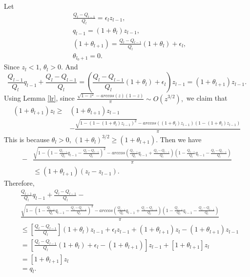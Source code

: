 \documentclass{article}
\begin{document}
Let
\begin{equation}
\begin{aligned}
&\frac{Q_{l}-Q_{l-1}}{Q_{l}}=\epsilon_lz_{l-1},\\
&q_{l-1}=(1+\theta_l)z_{l-1},\\
&(1+\theta_{l+1})=\frac{Q_l-Q_{l-1}}{Q_l}(1+\theta_l)+\epsilon_l,\\
&\theta_{l_0+1}=0.
\end{aligned}
\end{equation}
Since $z_l<1$, $\theta_{l}>0$. And
$$\frac{Q_{l-1}}{Q_{l}}q_{l-1}+\frac{Q_{l}-Q_{l-1}}{Q_{l}}=(\frac{Q_l-Q_{l-1}}{Q_l}(1+\theta_l)+\epsilon_l)z_{l-1}=(1+\theta_{l+1})z_{l-1}.$$
Using Lemma \ref{lr},
since $\frac{\sqrt{1-z^2}-arccos(z)(1-z)}{\pi}\sim O(z^{3/2}),$ we claim that
\begin{equation}
\begin{aligned}
(1+\theta_{l+1})z_{l}\geq &(1+\theta_{l+1})z_{l-1}\\
&- \frac{\sqrt{1-(1-(1+\theta_{l})z_{l-1})^2}-arccos((1+\theta_{l})z_{l-1})(1-(1+\theta_{l})z_{l-1})}{\pi}
\end{aligned}
\end{equation}
This is because $\theta_{l}>0$, $(1+\theta_{l})^{3/2} \geq (1+\theta_{l+1})$. Then we have
\begin{equation}
\begin{aligned}
-&\frac{\sqrt{1-(1-\frac{Q_{l-1}}{Q_{l}}q_{l-1}-\frac{Q_{l}-Q_{l-1}}{Q_{l}})^2}-arccos(\frac{Q_{l-1}}{Q_{l}}q_{l-1}+\frac{Q_{l}-Q_{l-1}}{Q_{l}})(1-\frac{Q_{l-1}}{Q_{l}}q_{l-1}-\frac{Q_{l}-Q_{l-1}}{Q_{l}})}{\pi}\\
&\leq (1+\theta_{l+1})(z_l-z_{l-1}).
\end{aligned}
\end{equation}
Therefore,
\begin{equation}
\begin{aligned}
&\frac{Q_{l-1}}{Q_{l}}q_{l-1}+\frac{Q_{l}-Q_{l-1}}{Q_{l}}-\\ &\frac{\sqrt{1-(1-\frac{Q_{l-1}}{Q_{l}}q_{l-1}-\frac{Q_{l}-Q_{l-1}}{Q_{l}})^2}-arccos(\frac{Q_{l-1}}{Q_{l}}q_{l-1}+\frac{Q_{l}-Q_{l-1}}{Q_{l}})(1-\frac{Q_{l-1}}{Q_{l}}q_{l-1}-\frac{Q_{l}-Q_{l-1}}{Q_{l}})}{\pi}\\
&\leq [\frac{Q_l-Q_{l-1}}{Q_l}](1+\theta_l)z_{l-1}+\epsilon_lz_{l-1}+(1+\theta_{l+1})z_l-(1+\theta_{l+1})z_{l-1}\\
&= [\frac{Q_l-Q_{l-1}}{Q_l}(1+\theta_l)+\epsilon_l-(1+\theta_{l+1})]z_{l-1}+[1+\theta_{l+1}]z_l\\
&=[1+\theta_{l+1}]z_l\\
&=q_l.
\end{aligned}
\end{equation}
\end{document}
